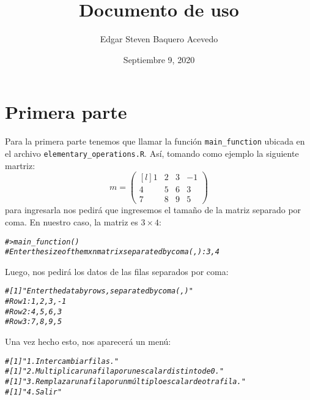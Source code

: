 \documentclass{article}\usepackage[]{graphicx}\usepackage[]{color}
\title{Documento de uso}
\author{Edgar Steven Baquero Acevedo}
\date{Septiembre 9, 2020}
\makeatletter
\newcommand{\hlcom}[1]{\textcolor[rgb]{0.678,0.584,0.686}{\textit{#1}}}%
\newenvironment{kframe}{%
 \def\at@end@of@kframe{}%
 \ifinner\ifhmode%
  \def\at@end@of@kframe{\end{minipage}}%
  \begin{minipage}{\columnwidth}%
 \fi\fi%
 \def\FrameCommand##1{\hskip\@totalleftmargin \hskip-\fboxsep
 \colorbox{shadecolor}{##1}\hskip-\fboxsep
     \hskip-\linewidth \hskip-\@totalleftmargin \hskip\columnwidth}%
 \MakeFramed {\advance\hsize-\width
   \@totalleftmargin\z@ \linewidth\hsize
   \@setminipage}}%
 {\par\unskip\endMakeFramed%
 \at@end@of@kframe}
\newenvironment{knitrout}{}{} %
\makeatother
\begin{document}
\maketitle

\section*{Primera parte}
Para la primera parte tenemos que llamar la función \texttt{main\_function} ubicada en el archivo \texttt{elementary\_operations.R}. Así, tomando como ejemplo la siguiente martriz:
\begin{equation*}
m=
\begin{pmatrix*}[l]
1 & 2 & 3 & -1\\
4 & 5 & 6 & 3\\
7 & 8 & 9 & 5
\end{pmatrix*}
\end{equation*}
para ingresarla nos pedirá que ingresemos el tamaño de la matriz separado por coma. En nuestro caso, la matriz es $3\times 4$:
\begin{knitrout}
\color{fgcolor}\begin{kframe}
\begin{alltt}
\hlcom{# > main_function()}
\hlcom{# Enter the size of the mxn matrix separated by coma (,):3,4}
\end{alltt}
\end{kframe}
\end{knitrout}
Luego, nos pedirá los datos de las filas separados por coma:
\begin{knitrout}
\color{fgcolor}\begin{kframe}
\begin{alltt}
\hlcom{# [1] "Enter the data by rows, separated by coma (,)"}
\hlcom{# Row 1: 1,2,3,-1}
\hlcom{# Row 2: 4,5,6,3}
\hlcom{# Row 3: 7,8,9,5}
\end{alltt}
\end{kframe}
\end{knitrout}
Una vez hecho esto, nos aparecerá un menú:
\begin{knitrout}
\color{fgcolor}\begin{kframe}
\begin{alltt}
\hlcom{# [1] "1. Intercambiar filas."}
\hlcom{# [1] "2. Multiplicar una fila por un escalar distinto de 0."}
\hlcom{# [1] "3. Remplazar una fila por un múltiplo escalar de otra fila."}
\hlcom{# [1] "4. Salir"}
\end{alltt}
\end{kframe}
\end{knitrout}
\end{document}

